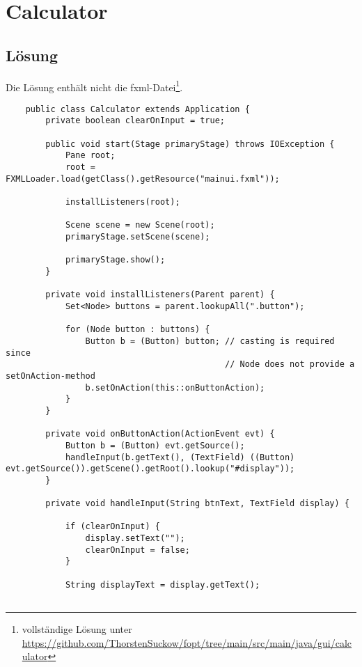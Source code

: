 \section{Calculator}\label{ch:calculator}


\subsection{Lösung}

Die Lösung enthält nicht die fxml-Datei\footnote{
vollständige Lösung unter \url{https://github.com/ThorstenSuckow/fopt/tree/main/src/main/java/gui/calculator}
}.

\begin{verbatim}
    public class Calculator extends Application {
        private boolean clearOnInput = true;

        public void start(Stage primaryStage) throws IOException {
            Pane root;
            root = FXMLLoader.load(getClass().getResource("mainui.fxml"));

            installListeners(root);

            Scene scene = new Scene(root);
            primaryStage.setScene(scene);

            primaryStage.show();
        }

        private void installListeners(Parent parent) {
            Set<Node> buttons = parent.lookupAll(".button");

            for (Node button : buttons) {
                Button b = (Button) button; // casting is required since
                                            // Node does not provide a setOnAction-method
                b.setOnAction(this::onButtonAction);
            }
        }

        private void onButtonAction(ActionEvent evt) {
            Button b = (Button) evt.getSource();
            handleInput(b.getText(), (TextField) ((Button) evt.getSource()).getScene().getRoot().lookup("#display"));
        }

        private void handleInput(String btnText, TextField display) {

            if (clearOnInput) {
                display.setText("");
                clearOnInput = false;
            }

            String displayText = display.getText();


\end{verbatim}
